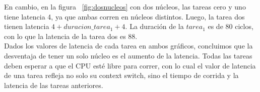 En cambio, en la figura ~\ref{fig:dosnucleos} con dos núcleos, las tareas cero y uno tiene latencia 4, ya que ambas corren en núcleos distintos. Luego, la tarea  dos tienen latencia $4 + duracion\_tarea_{1} + 4$. La duración de la $tarea_{1}$ es de 80 ciclos, con lo que la latencia de la tarea dos es 88.\\

Dados los valores de latencia de cada tarea en ambos gráficos, concluimos que la desventaja de tener un solo núcleo es el aumento de la latencia. Todas las tareas deben esperar a que el CPU esté libre para correr, con lo cual el valor de latencia de una tarea refleja no solo su context switch, sino el tiempo de corrida y la latencia de las tareas anteriores. 

